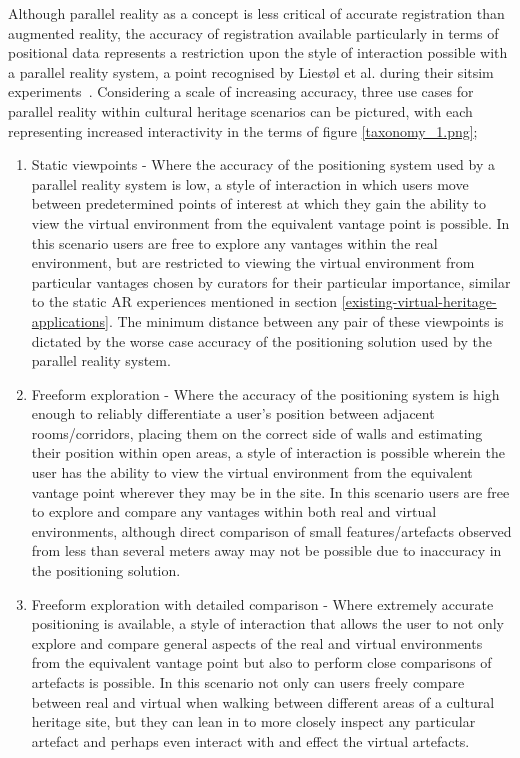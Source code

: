 Although parallel reality as a concept is less critical of accurate registration than augmented reality, the accuracy of registration available particularly in terms of positional data represents a restriction upon the style of interaction possible with a parallel reality system, a point recognised by Liest\o l et al. during their sitsim experiments~\cite{Liestøl2012}. Considering a scale of increasing accuracy, three use cases for parallel reality within cultural heritage scenarios can be pictured, with each representing increased interactivity in the terms of figure \ref{taxonomy_1.png};

\begin{enumerate}
	\item Static viewpoints - Where the accuracy of the positioning system used by a parallel reality system is low, a style of interaction in which users move between predetermined points of interest at which they gain the ability to view the virtual environment from the equivalent vantage point is possible. In this scenario users are free to explore any vantages within the real environment, but are restricted to viewing the virtual environment from particular vantages chosen by curators for their particular importance, similar to the static AR experiences mentioned in section \ref{existing-virtual-heritage-applications}. The minimum distance between any pair of these viewpoints is dictated by the worse case accuracy of the positioning solution used by the parallel reality system.
	
	\item Freeform exploration - Where the accuracy of the positioning system is high enough to reliably differentiate a user's position between adjacent rooms/corridors, placing them on the correct side of walls and estimating their position within open areas, a style of interaction is possible wherein the user has the ability to view the virtual environment from the equivalent vantage point wherever they may be in the site. In this scenario users are free to explore and compare any vantages within both real and virtual environments, although direct comparison of small features/artefacts observed from less than several meters away may not be possible due to inaccuracy in the positioning solution.
	
	\item Freeform exploration with detailed comparison - Where extremely accurate positioning is available, a style of interaction that allows the user to not only explore and compare general aspects of the real and virtual environments from the equivalent vantage point but also to perform close comparisons of artefacts is possible. In this scenario not only can users freely compare between real and virtual when walking between different areas of a cultural heritage site, but they can lean in to more closely inspect any particular artefact and perhaps even interact with and effect the virtual artefacts.
\end{enumerate}

